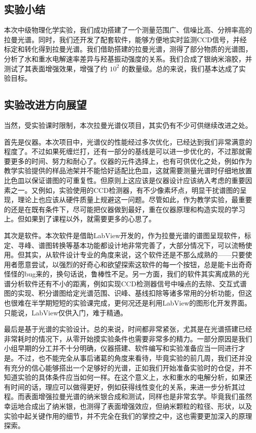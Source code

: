 \documentclass[UTF8]{article}
\begin{document}
	\subsection{实验小结}
	本次中级物理化学实验，我们成功搭建了一个测量范围广、信噪比高、分辨率高的拉曼光谱。同时，我们还开发了配套软件，能够方便地实时监测CCD信号，并经标定和转化得到拉曼光谱。我们借助搭建的拉曼光谱，测得了部分物质的光谱图，分析了水和重水电解速率差异与羟基振动强度的关系。我们合成了银纳米溶胶，并测试了其表面增强效果，增强了约 $10^2$ 的数量级。总的来说，我们基本达成了实验目标。

	\subsection{实验改进方向展望}
	当然，受实验课时限制，本次拉曼光谱仪项目，其实仍有不少可供继续改进之处。

	首先是仪器。本次项目中，光谱仪的性能经过多次优化，已经达到我们非常满意的程度了。不过如果死缠烂打，还有一部分的基线是可以进一步优化的，不过那就需要更多的时间、努力和耐心了。仪器的元件选择上，也有可供优化之处，例如作为教学实验提供的样品池架并不能恰好适配比色皿，这就需要测量光谱时仔细地放置比色皿以保证谱图的可重复性。但原则上这应该是仪器设计应该纳入考虑的重要因素之一。又例如，实验使用的CCD检测器，有不少像素坏点，明显干扰谱图的呈现，理论上也应该从硬件质量上规避这一问题。尽管如此，作为教学实验，最重要的还是在既有条件下，尽可能把仪器做到最好，重在仪器原理和构造实现的学习上。但如果到了课程以外，就需要更多的心思了。

	其次是软件。本次软件是借助LabView开发的，作为拉曼光谱的谱图呈现软件，标定、寻峰、谱图转换等基本功能都设计地非常完善了，大部分情况下，可以流畅使用。但其实，从软件设计专业的角度来说，这个软件还是不那么成熟的——只要使用者愿意尝试，以强烈的好奇心和欲望探索这软件的每一个按钮，总是能卡出奇奇怪怪的bug来的，换句话说，鲁棒性不足。另一方面，我们的软件其实离成熟的光谱分析软件还有不小的距离，例如实现CCD检测器信号中噪点的去除、交互式谱图的实现、积分谱图给定光谱范围、识峰、基线扣除等诸多常用的分析功能，但这也很难在半学期短短的实验课完成，更何况还是利用LabView的图形化开发界面。只能说，LabView仅供入门，难于精通。
	
	最后是基于光谱的实验设计。总的来说，时间都非常紧张，尤其是在光谱搭建已经非常耗时的情况下，从零开始摸实验条件也需要非常多的精力。一部分原因是我们小组早期的分工并不十分明确，仪器搭建、软件编写和实验准备应当一同进行才是。不过，也不能完全从事后诸葛的角度来看待，毕竟实验的前几周，我们还并没有充分的信心能够搭出一个足够好的光谱，正如我们开始准备实验时的仓促，并不知道实验的具体条件应当如何一样。在这个意义上，水和重水的电解分析，如果还有时间的话，理应可以做得更好，例如获得线性变化的关系，来进一步分析其过程。而表面增强拉曼光谱的纳米银合成和测试，同样也是非常玄学。毕竟我们虽然幸运地合成出了纳米银，也测得了表面增强效应，但纳米颗粒的粒径、形状，以及实验中起关键作用的细节，并不完全在我们的掌控之中，这也需要更加深入的原理探索。
\end{document}
